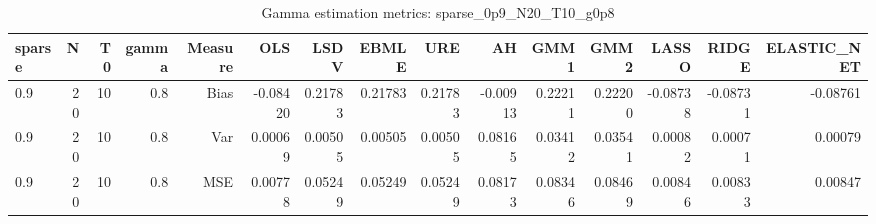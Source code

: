\begin{table}[!htbp]\centering
\caption{Gamma estimation metrics: sparse_0p9_N20_T10_g0p8}
\label{tab:table1_sparse_0p9_N20_T10_g0p8}
\begin{tabular}{lrrrrrrrrrrrrrr}
\hline
sparse & N & T0 & gamma & Measure & OLS & LSDV & EBMLE & URE & AH & GMM1 & GMM2 & LASSO & RIDGE & ELASTIC_NET \\
\hline
0.9 & 20 & 10 & 0.8 & Bias & -0.08420 & 0.21783 & 0.21783 & 0.21783 & -0.00913 & 0.22211 & 0.22200 & -0.08738 & -0.08731 & -0.08761 \\
0.9 & 20 & 10 & 0.8 & Var & 0.00069 & 0.00505 & 0.00505 & 0.00505 & 0.08165 & 0.03412 & 0.03541 & 0.00082 & 0.00071 & 0.00079 \\
0.9 & 20 & 10 & 0.8 & MSE & 0.00778 & 0.05249 & 0.05249 & 0.05249 & 0.08173 & 0.08346 & 0.08469 & 0.00846 & 0.00833 & 0.00847 \\
\hline
\end{tabular}
\end{table}

